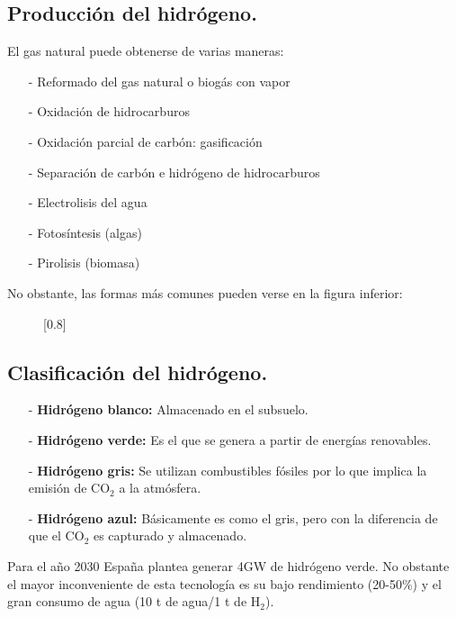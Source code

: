 \subsection{Producción del hidrógeno.}
El gas natural puede obtenerse de varias maneras:
\begin{itemize}
	\item [-]Reformado del gas natural o biogás con vapor
	\item [-]Oxidación de hidrocarburos
	\item [-]Oxidación parcial de carbón: gasificación
	\item [-]Separación de carbón e hidrógeno de hidrocarburos
	\item [-]Electrolisis del agua
	\item [-]Fotosíntesis (algas)
	\item [-]Pirolisis (biomasa)
\end{itemize}
No obstante, las formas más comunes pueden verse en la figura inferior:
\begin{figure}[H]
	\begin{center}
		\scalebox{0.8}[0.8]{
	}	\end{center}
\end{figure}
\subsection{Clasificación del hidrógeno.}
\begin{itemize}
	\item [-]\textbf{Hidrógeno blanco:} Almacenado en el subsuelo.
	\item [-]\textbf{Hidrógeno verde:} Es el que se genera a partir de energías renovables.
	\item [-]\textbf{Hidrógeno gris:} Se utilizan combustibles fósiles	por lo que implica la emisión de CO$_2$ a la atmósfera.
	\item [-]\textbf{Hidrógeno azul:} Básicamente es como el gris, pero con la diferencia de que el CO$_2$ es
	capturado y almacenado.
\end{itemize}
Para el año 2030 España plantea generar 4GW de hidrógeno verde. No obstante el mayor inconveniente de esta tecnología es su bajo rendimiento (20-50\%) y el gran consumo de agua (10 t de agua/1 t de H$_2$).

